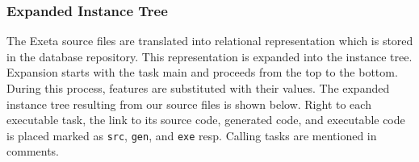 \documentclass[a4paper,12pt,english,oneside]{book}
\newcommand{\exeta}{Exeta\xspace}
\begin{document}
\subsubsection{Expanded Instance Tree}

The \exeta source files are translated into relational representation which is stored in the database repository. This representation is expanded into the instance tree. Expansion starts with the task main and proceeds from the top to the bottom. During this process, features are substituted with their values. The expanded instance tree resulting from our source files is shown below. Right to each executable task, the link to its source code, generated code, and executable code is placed marked as \texttt{src}, \texttt{gen}, and \texttt{exe} resp. Calling tasks are mentioned in comments.
\end{document}
